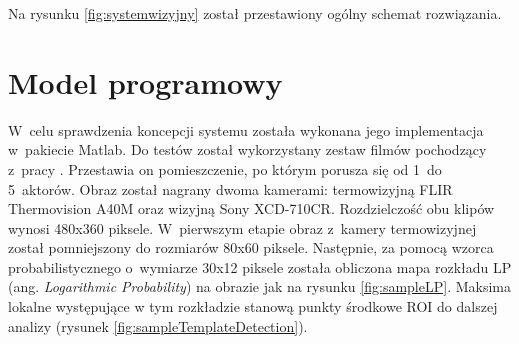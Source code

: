 Na rysunku \ref{fig:systemwizyjny} został przestawiony ogólny schemat rozwiązania.

\section{Model programowy}

W~celu sprawdzenia koncepcji systemu została wykonana jego implementacja w~pakiecie Matlab. 
Do testów został wykorzystany zestaw filmów pochodzący z~pracy \cite{bilodeau2014thermal}. 
Przestawia on pomieszczenie, po którym porusza się od 1~do 5~aktorów. 
Obraz został nagrany dwoma kamerami: termowizyjną FLIR Thermovision A40M oraz wizyjną Sony XCD-710CR. 
Rozdzielczość obu klipów wynosi 480x360 piksele. 
W~pierwszym etapie obraz z~kamery termowizyjnej został pomniejszony do rozmiarów 80x60 piksele. 
Następnie, za pomocą wzorca probabilistycznego o~wymiarze 30x12 piksele została obliczona mapa rozkładu LP (ang. \textit{Logarithmic Probability}) na obrazie jak na rysunku \ref{fig:sampleLP}. %
Maksima lokalne występujące w tym rozkładzie stanową punkty środkowe ROI do dalszej analizy (rysunek \ref{fig:sampleTemplateDetection}).
